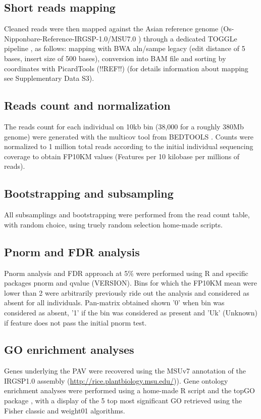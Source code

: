 \documentclass[10pt,letterpaper]{article}
\begin{document}
\subsection*{Short reads mapping}
Cleaned reads were then mapped against the Asian reference genome (Os-Nipponbare-Reference-IRGSP-1.0/MSU7.0 \cite{Mcnally2009, Kawahara2013}) through a dedicated TOGGLe pipeline \cite{Monat2015, Tranchant2018}, as follows: mapping with BWA aln/sampe legacy \cite{Li2009} (edit distance of 5 bases, insert size of 500 bases), conversion into BAM file and sorting by coordinates with PicardTools (!!REF!!) (for details information about mapping see Supplementary Data S3).


\subsection*{Reads count and normalization}
The reads count for each individual on 10kb bin (38,000 for a roughly 380Mb genome) were generated with the multicov tool from BEDTOOLS \cite{Quinlan2014}. Counts were normalized to 1 million total reads according to the initial individual sequencing coverage to obtain FP10KM values (Features per 10 kilobase per millions of reads).

\subsection*{Bootstrapping and subsampling}
All subsamplings and bootstrapping were performed from the read count table, with random choice, using truely random selection home-made scripts. 

\subsection*{Pnorm and FDR analysis}
Pnorm analysis and FDR approach at 5\% were performed using R and specific packages pnorm and qvalue \cite{Storey2015} (VERSION). Bins for which the FP10KM mean were lower than 2 were arbitrarily previously ride out the analysis and considered as absent for all individuals. Pan-matrix obtained shown '0' when bin was considered as absent, '1' if the bin was considered as present and  'Uk' (Unknown) if feature does not pass the initial pnorm test.

\subsection*{GO enrichment analyses}
Genes underlying the PAV were recovered using the MSUv7 annotation of the IRGSP1.0 assembly (\url{http://rice.plantbiology.msu.edu/})). Gene ontology enrichment analyses were performed using a home-made R script and the topGO package \cite{Alexa2016}, with a display of the 5 top most significant GO retrieved using the Fisher classic and weight01 algorithms.
\end{document}
